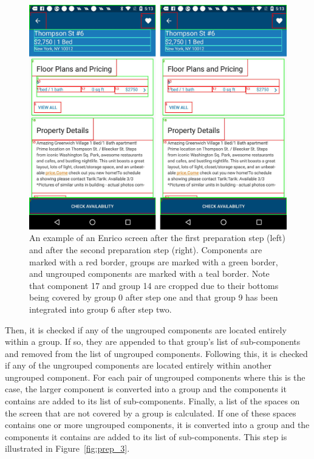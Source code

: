\documentclass[11pt,titlepage,oneside,openany]{book}
\begin{document}
\begin{figure}[H]
	\centering
	\includegraphics[width=.75\textwidth]{figures/grouping_example_step_1_2.png}
	\caption{An example of an Enrico screen after the first preparation step (left) and after the second preparation step (right). Components are marked with a red border, groups are marked with a green border, and ungrouped components are marked with a teal border. Note that component 17 and group 14 are cropped due to their bottoms being covered by group 0 after step one and that group 9 has been integrated into group 6 after step two.}
	\label{fig:prep_1}
\end{figure}

Then, it is checked if any of the ungrouped components are located entirely within a group. If so, they are appended to that group's list of sub-components and removed from the list of ungrouped components. Following this, it is checked if any of the ungrouped components are located entirely within another ungrouped component. For each pair of ungrouped components where this is the case, the larger component is converted into a group and the components it contains are added to its list of sub-components. Finally, a list of the spaces on the screen that are not covered by a group is calculated. If one of these spaces contains one or more ungrouped components, it is converted into a group and the components it contains are added to its list of sub-components. This step is illustrated in Figure~\ref{fig:prep_3}.
\end{document}

